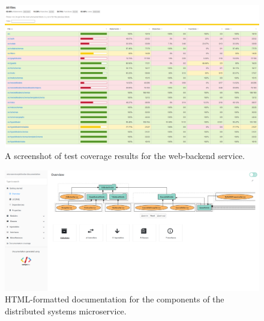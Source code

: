 \begin{figure}
    \centering
    \includegraphics[width=\textwidth]{4_proposed_solution/web_app/figures/test_coverage.png}
    \caption{A screenshot of test coverage results for the web-backend service.}
    \label{fig:test_coverage}
\end{figure}

\begin{figure}
    \centering
    \includegraphics[width=\textwidth]{4_proposed_solution/web_app/figures/html_doc.png}
    \caption{HTML-formatted documentation for the components of the distributed systems microservice.}
    \label{fig:html_doc}
\end{figure}